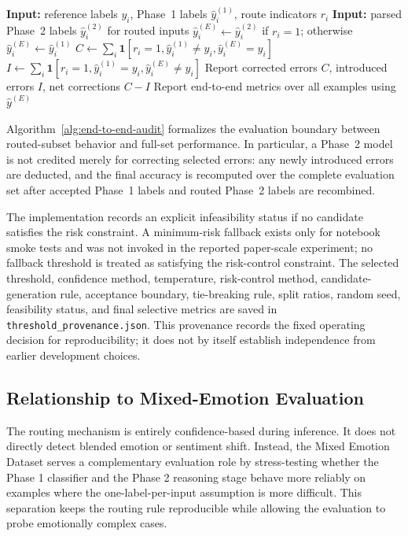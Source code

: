 \documentclass{ieeeaccess}
\begin{document}
\begin{algorithm}[t]
\caption{Audited end-to-end evaluation of routed predictions}
\label{alg:end-to-end-audit}
\footnotesize
\begin{algorithmic}[1]
\State \textbf{Input:} reference labels $y_i$, Phase~1 labels $\hat{y}^{(1)}_i$, route indicators $r_i$
\State \textbf{Input:} parsed Phase~2 labels $\hat{y}^{(2)}_i$ for routed inputs
    \State $\hat{y}^{(E)}_i \gets \hat{y}^{(2)}_i$ if $r_i=1$; otherwise $\hat{y}^{(E)}_i \gets \hat{y}^{(1)}_i$
\EndFor
\State $C\gets\sum_i\mathbf{1}[r_i=1,\hat{y}^{(1)}_i\ne y_i,\hat{y}^{(E)}_i=y_i]$
\State $I\gets\sum_i\mathbf{1}[r_i=1,\hat{y}^{(1)}_i=y_i,\hat{y}^{(E)}_i\ne y_i]$
\State Report corrected errors $C$, introduced errors $I$, net corrections $C-I$
\State Report end-to-end metrics over all examples using $\hat{y}^{(E)}$
\end{algorithmic}
\end{algorithm}

Algorithm~\ref{alg:end-to-end-audit} formalizes the evaluation boundary between routed-subset behavior and full-set performance. In particular, a Phase~2 model is not credited merely for correcting selected errors: any newly introduced errors are deducted, and the final accuracy is recomputed over the complete evaluation set after accepted Phase~1 labels and routed Phase~2 labels are recombined.

The implementation records an explicit infeasibility status if no candidate satisfies the risk constraint. A minimum-risk fallback exists only for notebook smoke tests and was not invoked in the reported paper-scale experiment; no fallback threshold is treated as satisfying the risk-control constraint. The selected threshold, confidence method, temperature, risk-control method, candidate-generation rule, acceptance boundary, tie-breaking rule, split ratios, random seed, feasibility status, and final selective metrics are saved in \texttt{threshold\_provenance.json}. This provenance records the fixed operating decision for reproducibility; it does not by itself establish independence from earlier development choices.

\subsection{Relationship to Mixed-Emotion Evaluation}

The routing mechanism is entirely confidence-based during inference. It does not directly detect blended emotion or sentiment shift. Instead, the Mixed Emotion Dataset serves a complementary evaluation role by stress-testing whether the Phase 1 classifier and the Phase 2 reasoning stage behave more reliably on examples where the one-label-per-input assumption is more difficult. This separation keeps the routing rule reproducible while allowing the evaluation to probe emotionally complex cases.
\end{document}
